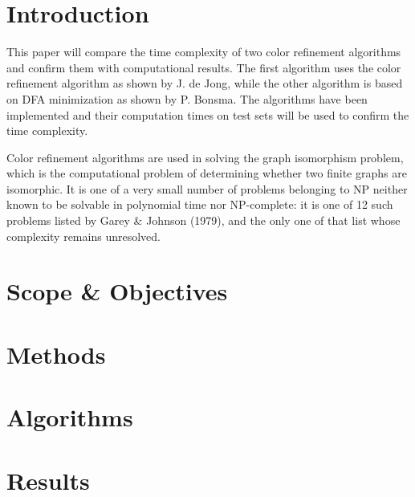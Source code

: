 \documentclass[twoside]{article}
\begin{document}
\begin{multicols}{2} %



\section{Introduction}
This paper will compare the time complexity of two color refinement algorithms and confirm them with computational results. The first algorithm uses the color refinement algorithm as shown by J. de Jong\cite{presentation:slidesPartI}, while the other algorithm is based on DFA minimization as shown by P. Bonsma\cite{presentation:slidesPartIII}. The algorithms have been implemented and their computation times on test sets will be used to confirm the time complexity.

Color refinement algorithms are used in solving the graph isomorphism problem, which is the computational problem of determining whether two finite graphs are isomorphic. It is one of a very small number of problems belonging to NP neither known to be solvable in polynomial time nor NP-complete: it is one of 12 such problems listed by Garey \& Johnson (1979)\cite{book:gareyJohnson1979}, and the only one of that list whose complexity remains unresolved.\cite{website:wikiGI}

\section{Scope \& Objectives}

\section{Methods}

\section{Algorithms} %

\section{Results}


\end{multicols}
\end{document}
